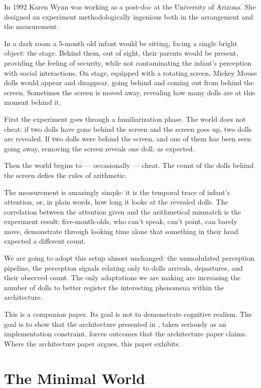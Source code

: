 \documentclass[12pt, a4paper]{article}
\begin{document}
In 1992 Karen Wynn was working as a post-doc at the University of Arizona. She
designed an experiment methodologically ingenious both in the arrangement and
the measurement.

In a dark room a 5-month old infant would be sitting, facing a single bright
object: the stage. Behind them, out of sight, their parents would be present,
providing the feeling of security, while not contaminating the infant's
perception with social interactions. On stage, equipped with a rotating screen,
Mickey Mouse dolls would appear and disappear, going behind and coming out from
behind the screen. Sometimes the screen is moved away, revealing how many dolls
are at this moment behind it.

First the experiment goes through a familiarization phase. The world does not
cheat: if two dolls have gone behind the screen and the screen goes up, two
dolls are revealed. If two dolls were behind the screen, and one of them has
been seen going away, removing the screen reveals one doll, as expected.

Then the world begins to --- occasionally --- cheat. The count of the dolls
behind the screen defies the rules of arithmetic.

The measurement is amazingly simple: it is the temporal trace of infant's
attention, or, in plain words, how long it looks at the revealed dolls. The
correlation between the attention given and the arithmetical mismatch is the
experiment result: five-month-olds, who can't speak, can't point, can barely
move, demonstrate through looking time alone that something in their head
expected a different count.

We are going to adopt this setup almost unchanged: the unmodulated perception
pipeline, the perception signals relating only to dolls arrivals, departures,
and their observed count. The only adaptations we are making are increasing the
number of dolls to better register the interesting phenomena within the
architecture.

This is a companion paper. Its goal is not to demonstrate cognitive realism.
The goal is to show that the architecture presented in \cite{architecture},
taken seriously as an implementation constraint, forces outcomes that the
architecture paper claims. Where the architecture paper argues, this paper
exhibits.

\section{The Minimal World}
\label{sec:world}
\end{document}
